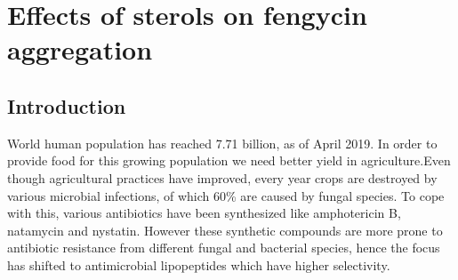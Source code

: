 \chapter{Effects of sterols on fengycin aggregation}
\label{c:chapter3}
\section{Introduction}
World human population has reached 7.71 billion, as of April 2019. In  order to provide food for
this growing population we need better yield in agriculture\cite{Haqq-Misra2019}.Even though agricultural practices have improved, every year 
crops are destroyed by various microbial infections, of which 60\% are caused by fungal species.\cite{Anthony2011} To cope with this, various 
antibiotics have been synthesized like amphotericin B, natamycin and nystatin\cite{Burke2012, 
Hammond1977, Prieto2006}. However these synthetic compounds are more prone to 
antibiotic resistance from different fungal and bacterial species, hence the focus has shifted to 
antimicrobial lipopeptides which have higher selectivity\cite{Avis2007}.

